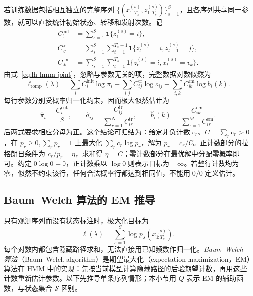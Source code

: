 若训练数据包括相互独立的完整序列 $\{(x^{(s)}_{1:T_s},z^{(s)}_{1:T_s})\}_{s=1}^S$，且各序列共享同一参数，就可以直接统计初始状态、转移和发射次数。记
\[
 \begin{aligned}
 C_i^{\mathrm{init}}&=\sum_{s=1}^S\mathbf1\{z_1^{(s)}=i\},\\
 C_{ij}^{\mathrm{tr}}&=\sum_{s=1}^S\sum_{t=1}^{T_s-1}
 \mathbf1\{z_t^{(s)}=i,z_{t+1}^{(s)}=j\},\\
 C_{ik}^{\mathrm{em}}&=\sum_{s=1}^S\sum_{t=1}^{T_s}
 \mathbf1\{z_t^{(s)}=i,x_t^{(s)}=v_k\}.
 \end{aligned}
\]
由式~\eqref{eq:lh-hmm-joint}，忽略与参数无关的项，完整数据对数似然为
\begin{equation}
\label{eq:lh-hmm-supervised-loglik}
 \ell_{\mathrm{comp}}(\lambda)
 =\sum_i C_i^{\mathrm{init}}\log\pi_i
 +\sum_{i,j}C_{ij}^{\mathrm{tr}}\log a_{ij}
 +\sum_{i,k}C_{ik}^{\mathrm{em}}\log b_i(k).
\end{equation}
每行参数分别受概率归一化约束，因而极大似然估计为
\begin{equation}
\label{eq:lh-hmm-supervised-mle}
 \widehat\pi_i=\frac{C_i^{\mathrm{init}}}{S},\qquad
 \widehat a_{ij}=\frac{C_{ij}^{\mathrm{tr}}}{\sum_{r=1}^N C_{ir}^{\mathrm{tr}}},\qquad
 \widehat b_i(k)=\frac{C_{ik}^{\mathrm{em}}}{\sum_{r=1}^M C_{ir}^{\mathrm{em}}}.
\end{equation}
后两式要求相应分母为正。这个结论可归结为：给定非负计数 $c_r$、$C=\sum_r c_r>0$，在 $p_r\geq0,\sum_rp_r=1$ 上最大化 $\sum_rc_r\log p_r$，解为 $p_r=c_r/C$。正计数部分的拉格朗日条件为 $c_r/p_r=\eta$，求和得 $\eta=C$；零计数部分在最优解中分配零概率即可。约定 $0\log0=0$，正计数乘以 $\log0$ 则表示目标为 $-\infty$。若整行计数均为零，似然不约束该行，任何合法概率行都达到相同值，不能用 $0/0$ 定义估计。

\subsection{Baum--Welch 算法的 EM 推导}

只有观测序列而没有状态标注时，极大化目标为
\begin{equation}
\label{eq:lh-hmm-observed-loglik}
 \ell(\lambda)=\sum_{s=1}^S\log p_\lambda(x^{(s)}_{1:T_s}).
\end{equation}
每个对数内都包含隐藏路径求和，无法直接用已知频数作归一化。\emph{Baum--Welch 算法}（Baum--Welch algorithm）是期望最大化（expectation-maximization，EM）算法在 HMM 中的实现：先按当前模型计算隐藏路径的后验期望计数，再用这些计数重新估计参数。以下先推导单条序列情形；本小节用 $Q$ 表示 EM 的辅助函数，与状态集合 $\mathcal S$ 区别。

